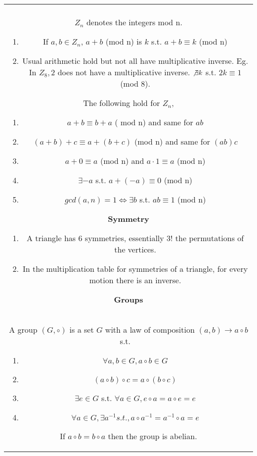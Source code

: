 \documentclass[a4paper]{article}
\begin{document}
    \pagestyle{empty}%
    \noindent
    \begin{tabular}{@{}c@{}}
    \begin{minipage}[t][\paperheight][t]{0.49\paperwidth}%
        \textbf{Integers (mod n)}\\
        $Z_n$ denotes the integers mod n. 
         \begin{enumerate}
            \item If $a,b \in Z_n$, $a + b$ (mod n) is  $k$ s.t. $a + b \equiv k$ (mod n)
            \item Usual arithmetic hold but not all have multiplicative inverse. Eg. In $Z_8, 2$ does not have a multiplicative inverse. $\not \exists k$ s.t. $2k \equiv 1$ (mod 8). 
        \end{enumerate}


        The following hold for $Z_n$, 
        \begin{enumerate}
            \item $a + b \equiv b + a $ ( mod n) and same for  $ab$
            \item  $(a + b) + c \equiv a + (b + c)$ (mod n) and same for  $(ab)c$
            \item $a + 0 \equiv a$ (mod n) and  $a \cdot 1\equiv a$ (mod n)
            \item $\exists -a$ s.t. $a + (-a) \equiv 0$ (mod n)
            \item $gcd(a,n) = 1 \iff \exists b$ s.t.  $ab \equiv 1$ (mod n)
        \end{enumerate}

        \textbf{Symmetry}
        \begin{enumerate}
            \item A triangle has 6 symmetries, essentially $3!$ the permutations of the vertices.
            \item In the multiplication table for symmetries of a triangle, for every motion there is an inverse.
        \end{enumerate}



        \textbf{Groups}\\
        A group $(G, \circ)$ is a set $G$ with a law of composition $(a,b) \rightarrow a \circ b$ s.t.
        \ \begin{enumerate}
            \item $\forall a,b \in G, a \circ b \in G$
            \item $(a \circ b) \circ c = a \circ ( b \circ c)$
            \item $\exists e \in G$ s.t. $\forall a \in G, e\circ a = a\circ e = e$
            \item  $\forall a \in G, \exists a^{-1} s.t., a\circ a^{-1} = a^{-1} \circ a = e$
        \end{enumerate}         
        If $a \circ b = b \circ a $ then the group is abelian.


\end{minipage}
\end{tabular}
\end{document}
